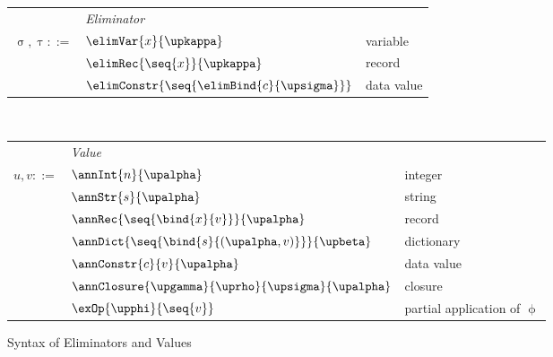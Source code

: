 \begin{figure}
    {\small
    \begin{minipage}[t]{0.48\textwidth}
        \begin{tabularx}{\textwidth}{rL{2.7cm}L{3cm}}
            &\textit{Eliminator}&
            \\
            $\upsigma, \uptau ::=$
            &
            $\elimVar{x}{\upkappa}$
            &
            variable
            \\
            &
            $\elimRec{\seq{x}}{\upkappa}$
            &
            record
            \\
            &
            $\elimConstr{\seq{\elimBind{c}{\upsigma}}}$
            &
            data value
            \\[2mm]
        \end{tabularx}
    \end{minipage}\\[3mm]%
    \begin{minipage}[t]{0.48\textwidth}
        \begin{tabularx}{\textwidth}{rL{2.7cm}L{3cm}}
            &\textit{Value}&
      \\
      $u, v ::=$
      &
      $\annInt{n}{\upalpha}$
      &
      integer
      \\
      &
      $\annStr{s}{\upalpha}$
      &
      string
      \\
      &
      $\annRec{\seq{\bind{x}{v}}}{\upalpha}$
      &
      record
      \\
      &
      $\annDict{\seq{\bind{s}{(\upalpha, v)}}}{\upbeta}$
      &
      dictionary
      \\
      &
      $\annConstr{c}{v}{\upalpha}$
      &
      data value
      \\
      &
      $\annClosure{\upgamma}{\uprho}{\upsigma}{\upalpha}$
      &
      closure
      \\
      &
      $\exOp{\upphi}{\seq{v}}$
      &
      partial application of $\upphi$
      \\[0mm]
      \end{tabularx}
   \end{minipage}
    }
    \caption{Syntax of Eliminators and Values}
\end{figure}